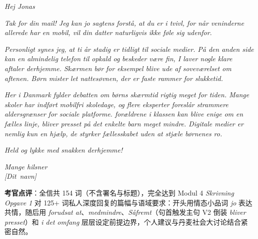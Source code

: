 \begin{answerbox}
\textit{Hej Jonas}

\textit{Tak for din mail! Jeg kan jo sagtens forstå, at du er i tvivl, for når veninderne allerede har en mobil, vil din datter naturligvis ikke føle sig udenfor.}

\textit{Personligt synes jeg, at ti år stadig er tidligt til sociale medier. På den anden side kan en almindelig telefon til opkald og beskeder være fin,  I laver nogle klare aftaler derhjemme. Skærmen bør for eksempel blive ude af soveværelset om aftenen. Børn mister let nattesøvnen,  der er faste rammer for slukketid.}

\textit{Her i Danmark fylder debatten om børns skærmtid rigtig meget for tiden. Mange skoler har indført mobilfri skoledage, og flere eksperter foreslår strammere aldersgrænser for sociale platforme.  forældrene i klassen kan blive enige om en fælles linje, bliver presset på det enkelte barn meget mindre. Digitale medier er nemlig kun en hjælp,  de styrker fællesskabet uden at stjæle børnenes ro.}

\textit{Held og lykke med snakken derhjemme!}

\textit{Mange hilsner\\
\mbox{[Dit navn]}}

\small\textbf{考官点评}：全信共 154 词（不含署名与标题），完全达到 Modul 4 \textit{Skrivning Opgave 1} 对 125+ 词私人深度回复的篇幅与语域要求：开头用情态小品词 \textit{jo} 表达共情，随后用 \textit{forudsat at}、\textit{medmindre}、\textit{Såfremt}（句首触发主句 V2 倒装 \textit{bliver presset}）和 \textit{i det omfang} 层层设定前提边界，个人建议与丹麦社会大讨论结合紧密自然。
\end{answerbox}
